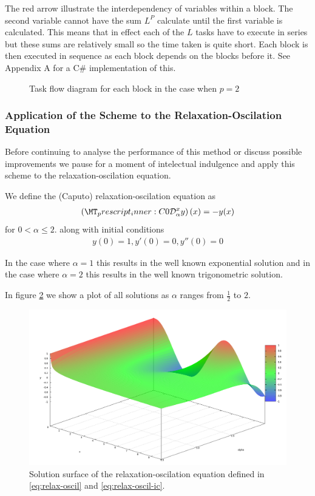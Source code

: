 The red arrow illustrate the interdependency of variables within a block. The second variable cannot have the sum $ L^P $ calculate until the first variable is calculated. This means that in effect each of the $ L $ tasks have to execute in series but these sums are relatively small so the time taken is quite short. Each block is then executed in sequence as each block depends on the blocks before it. See Appendix A for a C\# implementation of this. 

\begin{figure}[H]
    
    \caption{Task flow diagram for each block in the case when $ p = 2 $}
    \label{fig:AMB_Task_Flow}
\end{figure}

\subsubsection{Application of the Scheme to the Relaxation-Oscilation Equation}
Before continuing to analyse the performance of this method or discuss possible improvements we pause for a moment of intelectual indulgence and apply this scheme to the relaxation-oscilation equation.

We define the (Caputo) relaxation-oscilation equation as
\begin{align}
    \label{eq:relax-oscil}
    \capder{0}{\alpha}{x}{y}(x) = -y(x)
\end{align}
for $ 0 < \alpha \leq 2 $.
along with initial conditions 
\begin{align}
    \label{eq:relax-oscil-ic}
    y(0) = 1, y'(0) = 0, y''(0) = 0
\end{align}

In the case where $ \alpha = 1 $ this results in the well known exponential solution and in the case where $ \alpha = 2 $ this results in the well known trigonometric solution.

In figure \ref{fig:Relax_Oscil} we show a plot of all solutions as $ \alpha $ ranges from $ \frac{1}{2} $ to $ 2 $.

\begin{figure}[H]
    \includegraphics[scale = 0.3]{images/FDE_Solution_Surface_No_Label}
    \caption{Solution surface of the relaxation-oscilation equation defined in \eqref{eq:relax-oscil} and \eqref{eq:relax-oscil-ic}.}
    \label{fig:Relax_Oscil}
\end{figure}


